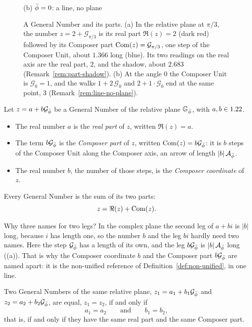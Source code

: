 \begin{figure}[tb]
\begin{minipage}[b]{0.34\textwidth}
\smallskip
{\small (b) $\bar{\phi} = 0$: a line, no plane\par}
\end{minipage}
\caption[A General Number and its parts]{A General Number and its parts. (a) In the relative plane at $\pi/3$, the number $z = 2 + \mathcal{G}_{\pi/3}$ is its real part $\Re(z) = 2$ (dark red) followed by its Composer part $\operatorname{Com}(z) = \mathcal{G}_{\pi/3}$, one step of the Composer Unit, about $1.366$ long (blue). Its two readings on the real axis are the real part, $2$, and the shadow, about $2.683$ (Remark~\ref{rem:part-shadow}). (b) At the angle $0$ the Composer Unit is $\mathcal{G}_0 = 1$, and the walks $1 + 2\,\mathcal{G}_0$ and $2 + 1 \cdot \mathcal{G}_0$ end at the same point, $3$ (Remark~\ref{rem:line-no-plane}).}
\label{fig:gn-parts}
\end{figure}

\begin{definition}\label{def:gn-parts}
Let $z = a + b\mathcal{G}_{\bar{\phi}}$ be a General Number of the relative plane $\mathbb{G}_{\bar{\phi}}$, with $a, b \in 1.22$.
\begin{itemize}
  \item The real number $a$ is the \emph{real part} of $z$, written $\Re(z) = a$.
  \item The term $b\mathcal{G}_{\bar{\phi}}$ is the \emph{Composer part} of $z$, written $\operatorname{Com}(z) = b\mathcal{G}_{\bar{\phi}}$: it is $b$ steps of the Composer Unit along the Composer axis, an arrow of length $|b|\,\mathcal{A}_{\bar{\phi}}$.
  \item The real number $b$, the number of those steps, is the \emph{Composer coordinate} of $z$.
\end{itemize}
Every General Number is the sum of its two parts:
\[
z = \Re(z) + \operatorname{Com}(z).
\]
\end{definition}

\begin{plainwords}
Why three names for two legs? In the complex plane the second leg of $a + bi$ is $|b|$ long, because $i$ has length one, so the number $b$ and the leg $bi$ hardly need two names. Here the step $\mathcal{G}_{\bar{\phi}}$ has a length of its own, and the leg $b\mathcal{G}_{\bar{\phi}}$ is $|b|\,\mathcal{A}_{\bar{\phi}}$ long ((a)). That is why the Composer coordinate $b$ and the Composer part $b\mathcal{G}_{\bar{\phi}}$ are named apart: it is the non-unified reference of Definition~\ref{def:non-unified}, in one line.
\end{plainwords}

\begin{definition}\label{def:gn-equality}
Two General Numbers of the same relative plane, $z_1 = a_1 + b_1\mathcal{G}_{\bar{\phi}}$ and $z_2 = a_2 + b_2\mathcal{G}_{\bar{\phi}}$, are equal, $z_1 = z_2$, if and only if
\[
a_1 = a_2 \qquad \text{and} \qquad b_1 = b_2 ,
\]
that is, if and only if they have the same real part and the same Composer part.
\end{definition}

